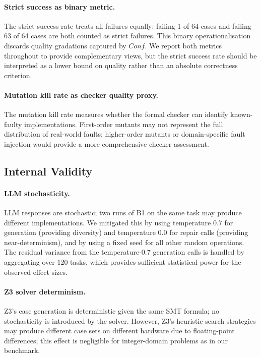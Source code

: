 \paragraph{Strict success as binary metric.}
The strict success rate treats all failures equally: failing 1 of 64 cases and
failing 63 of 64 cases are both counted as strict failures.  This binary
operationalisation discards quality gradations captured by $\mathit{Conf}$.  We
report both metrics throughout to provide complementary views, but the strict success
rate should be interpreted as a lower bound on quality rather than an absolute
correctness criterion.

\paragraph{Mutation kill rate as checker quality proxy.}
The mutation kill rate measures whether the formal checker can identify known-faulty
implementations.  First-order mutants may not represent the full distribution of
real-world faults; higher-order mutants or domain-specific fault injection would
provide a more comprehensive checker assessment.

\subsection{Internal Validity}

\paragraph{LLM stochasticity.}
LLM responses are stochastic; two runs of B1 on the same task may produce different
implementations.  We mitigated this by using temperature 0.7 for generation (providing
diversity) and temperature 0.0 for repair calls (providing near-determinism), and by
using a fixed seed for all other random operations.  The residual variance from the
temperature-0.7 generation calls is handled by aggregating over 120 tasks, which
provides sufficient statistical power for the observed effect sizes.

\paragraph{Z3 solver determinism.}
Z3's case generation is deterministic given the same SMT formula; no stochasticity is
introduced by the solver.  However, Z3's heuristic search strategies may produce
different case sets on different hardware due to floating-point differences; this
effect is negligible for integer-domain problems as in our benchmark.

